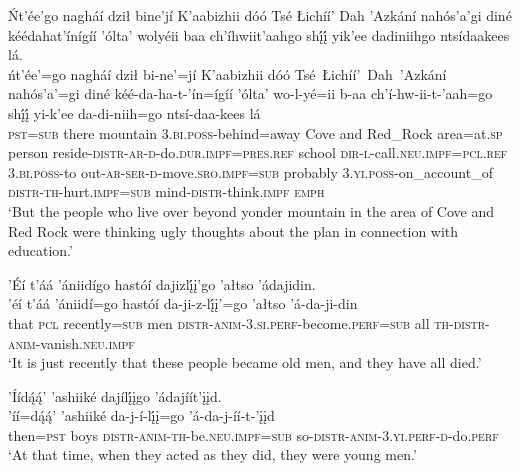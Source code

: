 \ea\label{ex:text1-21-1}
Ńt’ée’go nagháí dził bine’jí K’aabizhii dóó Tsé Łichíí’ Dah ’Azkání nahós’a’gi diné kéédahat’ínígíí ’ólta’ wolyéii baa ch’íhwiit’aahgo shį́į́ yik’ee dadiniihgo ntsídaakees lá.\\
\gll ńt’ée’=go	nagháí	dził	bi-ne’=jí	K’aabizhii	dóó	Tsé~Łichíí’~Dah~{’Azkání}	nahós’a’=gi	diné	kéé-da-ha-t-’ín=ígíí	’ólta’	wo-l-yé=ii	b-aa	ch’í-hw-ii-t-’aah=go	shį́į́	yi-k’ee	da-di-niih=go	ntsí-daa-kees	lá\\
     \textsc{pst}=\textsc{sub}	there	mountain	3.\textsc{bi}.\textsc{poss}-behind=away	Cove	and	Red\_Rock	area=at.\textsc{sp}	person	reside-\textsc{distr}-\textsc{ar}-\textsc{d}-do.\textsc{dur}.\textsc{impf}=\textsc{pres}.\textsc{ref}	school	\textsc{dir}-\textsc{l}-call.\textsc{neu}.\textsc{impf}=\textsc{pcl}.\textsc{ref}	3.\textsc{bi}.\textsc{poss}-to	out-\textsc{ar}-\textsc{ser}-\textsc{d}-move.\textsc{sro}.\textsc{impf}=\textsc{sub}	probably	3.\textsc{yi}.\textsc{poss}-on\_account\_of	\textsc{distr}-\textsc{th}-hurt.\textsc{impf}=\textsc{sub}	mind-\textsc{distr}-think.\textsc{impf}	\textsc{emph}\\
\glt `But the people who live over beyond yonder mountain in the area of Cove and Red Rock were thinking ugly thoughts about the plan in connection with education.'
\z

\ea\label{ex:text1-21-2}
’Éí t’áá ’ániidígo hastóí dajizlį́į’go ’ałtso ’ádajidin.\\
\gll ’éí	t’áá	’ániidí=go	hastóí	da-ji-z-lį́į’=go	’ałtso	’á-da-ji-din\\
     that	\textsc{pcl}	recently=\textsc{sub}	men	\textsc{distr}-\textsc{anim}-3.\textsc{si}.\textsc{perf}-become.\textsc{perf}=\textsc{sub}	all	\textsc{th}-\textsc{distr}-\textsc{anim}-vanish.\textsc{neu}.\textsc{impf}\\
\glt `It is just recently that these people became old men, and they have all died.'
\z

\ea\label{ex:text1-21-3}
’Íídą́ą́’ ’ashiiké dajílį́įgo ’ádajíít’įįd.\\
\gll ’íí=dą́ą́’	’ashiiké	da-j-í-lį́į=go	’á-da-j-íí-t-’įįd\\
     then=\textsc{pst}	boys	\textsc{distr}-\textsc{anim}-\textsc{th}-be.\textsc{neu}.\textsc{impf}=\textsc{sub}	so-\textsc{distr}-\textsc{anim}-3.\textsc{yi}.\textsc{perf}-\textsc{d}-do.\textsc{perf}\\
\glt `At that time, when they acted as they did, they were young men.'
\z

